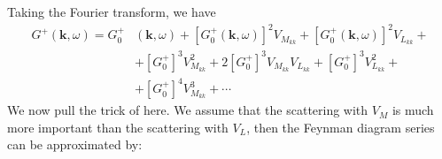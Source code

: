 Taking the Fourier transform, we have
\begin{equation}\begin{aligned}
G^{+}(\mathbf{k}, \omega)=G_{0}^{+} &(\mathbf{k}, \omega)+\left[G_{0}^{+}(\mathbf{k}, \omega)\right]^{2} V_{M_{k k}}+\left[G_{0}^{+}(\mathbf{k}, \omega)\right]^{2} V_{L_{kk}}+\\
&+\left[G_{0}^{+}\right]^{3} V_{M_{kk}}^{2}+2\left[G_{0}^{+}\right]^{3} V_{M_{kk}} V_{L_{kk}}+\left[G_{0}^{+}\right]^{3} V_{L_{kk}}^{2}+\\
&+\left[G_{0}^{+}\right]^{4} V_{M_{kk}}^{3}+\cdots
\end{aligned}\end{equation}
We now pull the trick of  here. We assume that the scattering with $V_M$ is much more important than the scattering with $V_L$, then the Feynman diagram series can be approximated by:
